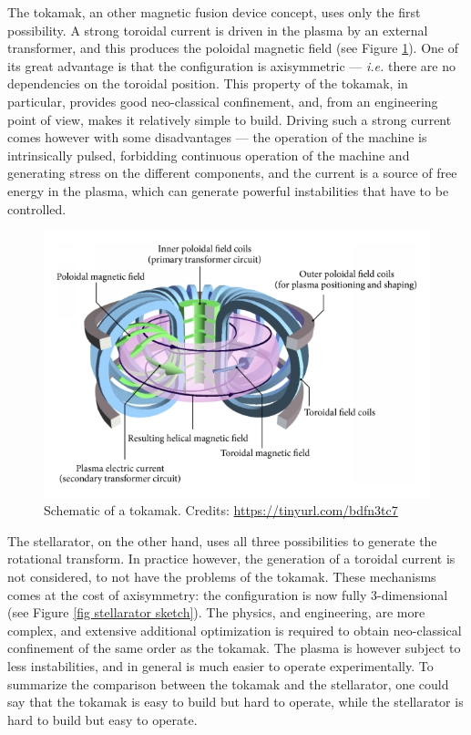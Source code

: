 \documentclass[my_thesis.tex]{subfiles}
\begin{document}
The tokamak, an other magnetic fusion device concept, uses only the first possibility. A strong toroidal current is driven in the plasma by an external transformer, and this produces the poloidal magnetic field (see Figure \ref{fig tokamak sketch}). One of its great advantage is that the configuration is axisymmetric --- \textit{i.e.} there are no dependencies on the toroidal position. This property of the tokamak, in particular, provides good neo-classical confinement, and, from an engineering point of view, makes it relatively simple to build. Driving such a strong current comes however with some disadvantages --- the operation of the machine is intrinsically pulsed, forbidding continuous operation of the machine and generating stress on the different components, and the current is a source of free energy in the plasma, which can generate powerful instabilities that have to be controlled.

\begin{figure}
    \centering
    \includegraphics[width=\linewidth]{images/Introduction/TokamakSketch.jpg}
    \caption{Schematic of a tokamak. Credits: \url{https://tinyurl.com/bdfn3tc7}}
    \label{fig tokamak sketch}
\end{figure}

The stellarator, on the other hand, uses all three possibilities to generate the rotational transform. In practice however, the generation of a toroidal current is not considered, to not have the problems of the tokamak. These mechanisms comes at the cost of axisymmetry: the configuration is now fully 3-dimensional (see Figure \ref{fig stellarator sketch}). The physics, and engineering, are more complex, and extensive additional optimization is required to obtain neo-classical confinement of the same order as the tokamak. The plasma is however subject to less instabilities, and in general is much easier to operate experimentally. To summarize the comparison between the tokamak and the stellarator, one could say that the tokamak is easy to build but hard to operate, while the stellarator is hard to build but easy to operate.
\end{document}
